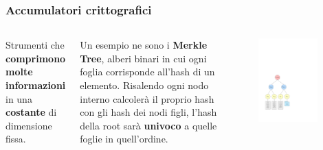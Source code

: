 \documentclass{beamer}
\begin{document}
\begin{frame}
	\frametitle{Accumulatori crittografici}
	\begin{columns}
		Strumenti che \textbf{comprimono molte informazioni}
		in una \textbf{costante} di dimensione fissa.
		
		Un esempio ne sono i \textbf{Merkle Tree}, alberi binari
		in cui ogni foglia corrisponde all'hash di un elemento.
		Risalendo ogni nodo interno calcolerà il proprio hash
		con gli hash dei nodi figli, l'hash della root
		sarà \textbf{univoco} a quelle foglie in quell'ordine.
		\begin{figure}
			\includegraphics[width=0.9\textwidth]{figures/mt1.pdf}
		\end{figure}
	\end{columns}
\end{frame}
\end{document}
